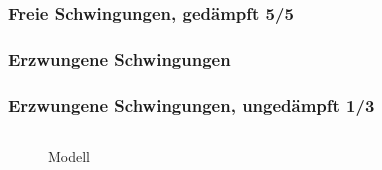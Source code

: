 \documentclass[hyperref={pdfpagemode=FullScreen, colorlinks=false}]{beamer}
\begin{document}
\begin{frame}
\frametitle{Freie Schwingungen, {\normalsize gedämpft 5/5}}



\end{frame}





\subsubsection{Erzwungene Schwingungen}
\begin{frame}
\frametitle{Erzwungene Schwingungen, {\normalsize ungedämpft 1/3}}
\begin{columns}
        \begin{column}[t]{.5\linewidth}
        \begin{figure}

\caption*{Modell }
\end{figure}
        \end{column}
		\hfill
		\begin{column}[t]{.5\linewidth}
		\end{column}
\end{columns}
\end{frame}
\end{document}
